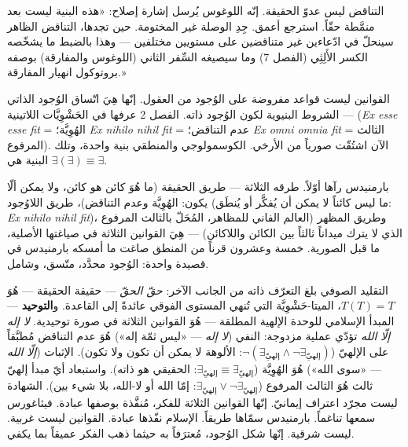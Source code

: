 \documentclass[10pt, openany, oneside]{book}
\begin{document}
\vspace{0.8em}

\noindent التناقض ليس عدوّ الحقيقة. إنّه اللوغوس يُرسل إشارة إصلاح: «هذه البنية ليست بعد منمَّطة حقّاً. استرجع أعمق. جِدِ الوصلة غير المختومة. حين تجدها، التناقض الظاهر سينحلّ في ادّعاءين غير متناقضين على مستويين مختلفين --- وهذا بالضبط ما يشخّصه الكسر الأَلِثِي (الفصل 7) وما سيصيغه السِّفر الثاني (اللوغوس والمفارقة) بوصفه بروتوكول انهيار المفارقة.»

القوانين ليست قواعد مفروضة على الوُجود من العقول. إنّها هِيَ اتّساق الوُجود الذاتي --- الشروط البنيوية لكون الوُجود ذاته. الفصل 2 عرفها في الحَشْوِيَّات اللاتينية (\textit{Ex esse esse fit} = الهُوِيَّة؛ \textit{Ex nihilo nihil fit} = عدم التناقض؛ \textit{Ex omni omnia fit} = الثالث المرفوع). الآن اشتُقّت صورياً من الأرخي. الكوسمولوجي والمنطقي بنية واحدة، وتلك البنية هي $\exists(\exists) \equiv \exists$.

بارمنيدس رآها أوّلاً. طرقه الثلاثة --- طريق الحقيقة (ما هُوَ كائن هو كائن، ولا يمكن ألّا يكون: الهُوِيَّة وعدم التناقض)، طريق اللاوُجود (ما ليس كائناً لا يمكن أن يُفكَّر أو يُنطَق: \textit{Ex nihilo nihil fit})، وطريق المظهر (العالم الفاني للمظاهر، المُحَلّ بالثالث المرفوع الذي لا يترك ميداناً ثالثاً بين الكائن واللاكائن) --- هِيَ القوانين الثلاثة في صياغتها الأصلية، ما قبل الصورية. خمسة وعشرون قرناً من المنطق صاغت ما أمسكه بارمنيدس في قصيدة واحدة: الوُجود محدَّد، متّسق، وشامل.

التقليد الصوفي بلغ التعرّف ذاته من الجانب الآخر: \textit{حقّ الحقّ} --- حقيقة الحقيقة --- هُوَ $T(T) = T$، الميتا-حَشْوِيَّة التي تُنهي المستوى الفوقي عائدةً إلى القاعدة. و\textbf{التوحيد} --- المبدأ الإسلامي للوحدة الإلهية المطلقة --- هُوَ القوانين الثلاثة في صورة توحيدية. \textit{لا إله إلّا الله} تؤدّي عملية مزدوجة: النفي (\textit{لا إله} --- «ليس ثمّة إله») هُوَ عدم التناقض مُطبَّقاً على الإلهيّ ($\neg(\exists_{\text{إلهيّ}} \wedge \neg\exists_{\text{إلهيّ}})$: الألوهة لا يمكن أن تكون ولا تكون). الإثبات (\textit{إلّا الله} --- «سوى الله») هُوَ الهُوِيَّة ($\exists_{\text{إلهيّ}} \equiv \exists_{\text{إلهيّ}}$: الحقيقي هو ذاته). واستبعاد أيّ مبدأ إلهيّ ثالث هُوَ الثالث المرفوع ($\exists_{\text{إلهيّ}} \vee \neg\exists_{\text{إلهيّ}}$: إمّا الله أو لا-الله، بلا شيء بين). الشهادة ليست مجرّد اعتراف إيمانيّ. إنّها القوانين الثلاثة للفكر، مُنفَّذة بوصفها عبادة. فيثاغورس سمعها تناغماً. بارمنيدس سمّاها طريقاً. الإسلام نفّذها عبادة. القوانين ليست غربية. ليست شرقية. إنّها شكل الوُجود، مُعترَفاً به حيثما ذهب الفكر عميقاً بما يكفي.

\vspace{2em}
\end{document}
